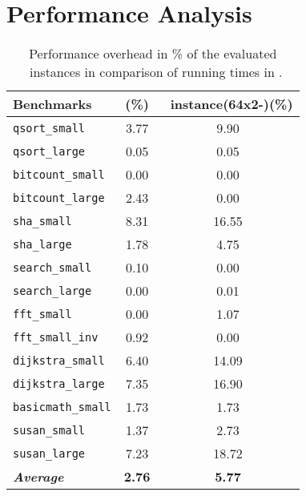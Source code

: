 \section{Performance Analysis}
\label{subsec:Performance-Analysis}


\begin{table*}[t]
	\center
	\caption{Performance overhead in \% of the evaluated \cshia~instances in comparison of running times in \baseline.}
	\label{tab:results}
	\footnotesize
	\begin{tabular}{|l|c|c|}
		\hline

	    Benchmarks				& \timestamp (\%)	& \cshiamt~instance(64x2-\lru)(\%)\\

		\hline
		\hline
		\texttt{qsort\_small}				& 	3.77	&	9.90\\
		\texttt{qsort\_large}				& 	0.05	&	0.05\\
		\texttt{bitcount\_small}			& 	0.00	&	0.00\\
		\texttt{bitcount\_large}			& 	2.43	&	0.00\\
		\texttt{sha\_small}					& 	8.31	&	16.55\\
		\texttt{sha\_large}					& 	1.78	&	4.75\\
		\texttt{search\_small}				& 	0.10	&	0.00\\
		\texttt{search\_large}				& 	0.00	&	0.01\\
		\texttt{fft\_small}					& 	0.00	&	1.07\\
		\texttt{fft\_small\_inv}			& 	0.92	&	0.00\\
		\texttt{dijkstra\_small}			& 	6.40	&	14.09\\
		\texttt{dijkstra\_large}			& 	7.35	&	16.90\\
		\texttt{basicmath\_small}			& 	1.73	&	1.73\\
		\texttt{susan\_small}				& 	1.37	&	2.73\\
		\texttt{susan\_large}				& 	7.23	&	18.72\\
		\hline
		\textit{\textbf{Average}}			&	\textbf{2.76}	&	\textbf{5.77}\\

		\hline
	\end{tabular}
\end{table*}

